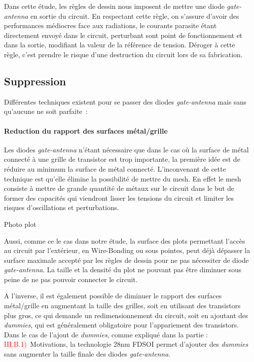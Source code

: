 Dans cette étude, les règles de dessin nous imposent de mettre une diode \textit{gate-antenna} en sortie du circuit. En respectant cette règle, on s’assure d’avoir des performances médiocres face aux radiations, le courants parasite étant directement envoyé dans le circuit, perturbant sont point de fonctionnement et dans la sortie, modifiant la valeur de la référence de tension. Déroger à cette règle, c’est prendre le risque d’une destruction du circuit lors de sa fabrication.

\subsection{Suppression}
Différentes techniques existent pour se passer des diodes \textit{gate-antenna} mais sans qu’aucune ne soit parfaite :
\paragraph{Reduction du rapport des surfaces métal/grille}
Les diodes \textit{gate-antenna} n’étant nécessaire que dans le cas où la surface de métal connecté à une grille de transistor est trop importante, la première idée est de réduire au minimum la surface de métal connecté. L’inconvenant de cette technique est qu’elle élimine la possibilité de mettre du mesh. En effet le mesh consiste à mettre de grande quantité de métaux sur le circuit dans le but de former des capacités qui viendront lisser les tensions du circuit et limiter les risques d’oscillations et perturbations.

\begin{metsUneSource}
Photo plot
\end{metsUneSource}

Aussi, comme ce le cas dans notre étude, la surface des plots permettant l’accès au circuit par l’extérieur, en Wire-Bonding ou sous pointes, peut déjà dépasser la surface maximale accepté par les règles de dessin pour ne pas nécessiter de diode \textit{gate-antenna}. La taille et la densité du plot ne pouvant pas être diminuer sous peine de ne pas pouvoir connecter le circuit.

A l'inverse, il est également possible de diminuer le rapport des surfaces métal/grille en augmentant la taille des grilles, soit en utilisant des transistors plus gros, ce qui demande un redimensionnement du circuit, soit en ajoutant des \textit{dummies}, qui est généralement obligatoire pour l'appariement des transistors.
Dans le cas de l'ajout de \textit{dummies}, comme expliqué dans la partie : \textcolor{red}{III.B.1)} Motivations, la technologie 28nm FDSOI permet d'ajouter des \textit{dummies} sans augmenter la taille finale des diodes \textit{gate-antenna}.

